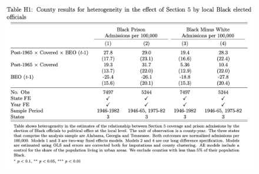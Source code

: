 \documentclass[12pt]{article}
\begin{document}
\begin{figure}[h!]
	\centering
	\includegraphics[width=\textwidth]{../../60_appendix_cty_results/table_h1.png}
\end{figure}


\end{document}
